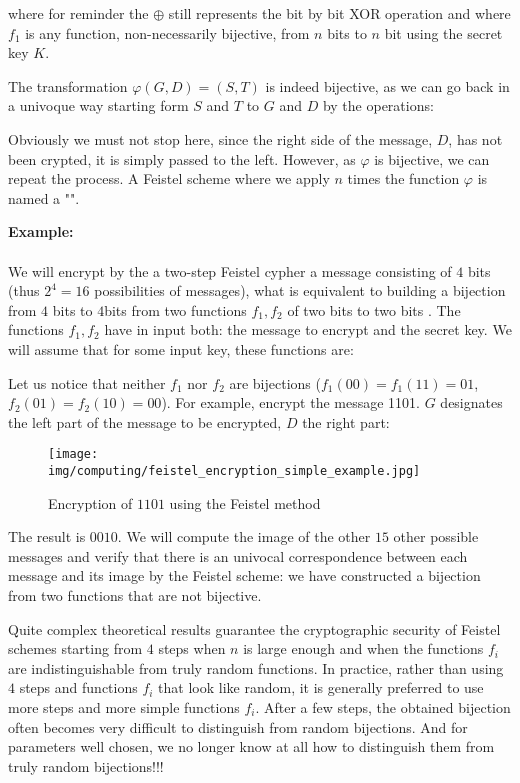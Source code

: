 	where for reminder the $\oplus$ still represents the bit by bit XOR operation and where $f_1$ is any function, non-necessarily bijective, from $n$ bits to $n$ bit using the secret key $K$.
	
	The transformation $\varphi(G,D)=(S,T)$ is indeed bijective, as we can go back in a univoque way starting form $S$ and $T$ to $G$ and $D$ by the operations:
	
	Obviously we must not stop here, since the right side of the message, $D$, has not been crypted, it is simply passed to the left. However, as $\varphi$ is bijective, we can repeat the process. A Feistel scheme where we apply $n$ times the function $\varphi$ is named a "".
	
	\begin{tcolorbox}[colframe=black,colback=white,sharp corners]
	\textbf{{\Large {}}Example:}\\\\
	We will encrypt by the a two-step Feistel cypher a message consisting of $4$ bits (thus $2^4=16$ possibilities of messages), what is equivalent to building a bijection from $4$ bits to $4$bits from two functions $f_1,f_2$ of two bits to two bits . The functions $f_1,f_2$ have in input both: the message to encrypt and the secret key. We will assume that for some input key, these functions are:
	
	Let us notice that neither $f_1$ nor $f_2$ are bijections ($f_1(00)=f_1(11)=01$,$f_2(01)=f_2(10)=00$). For example, encrypt the message 1101. $G$ designates the left part of the message to be encrypted, $D$ the right part:
	\begin{figure}[H]
		\centering
		\texttt{[image: img/computing/feistel\_encryption\_simple\_example.jpg]}
		\caption{Encryption of $1101$ using the Feistel method}
	\end{figure}
	The result is $0010$. We will compute the image of the other $15$ other possible messages and verify that there is an univocal correspondence between each message and its image by the Feistel scheme: we have constructed a bijection from two functions that are not bijective.
	\end{tcolorbox}

	\pagebreak
	Quite complex theoretical results guarantee the cryptographic security of Feistel schemes starting from $4$ steps when $n$ is large enough and when the functions $f_i$ are indistinguishable from truly random functions. In practice, rather than using $4$ steps and functions $f_i$ that look like random, it is generally preferred to use more steps and more simple functions $f_i$. After a few steps, the obtained bijection often becomes very difficult to distinguish from random bijections. And for parameters well chosen, we no longer know at all how to distinguish them from truly random bijections!!!

